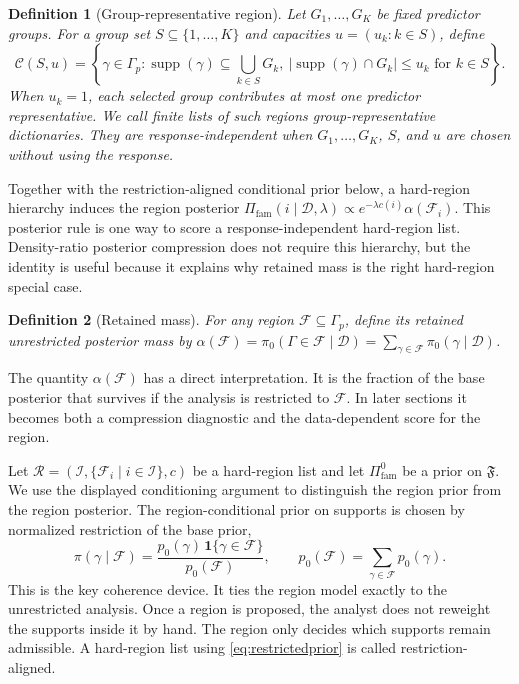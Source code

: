 \documentclass[twoside,11pt]{article}
\newtheorem{definition}{Definition}
\newcommand{\D}{\mathcal{D}}
\newcommand{\F}{\mathcal{F}}
\newcommand{\Fp}{\mathfrak{F}}
\newcommand{\ind}{\mathbf{1}}
\newcommand{\supp}{\operatorname{supp}}
\begin{document}
\begin{definition}[Group-representative region]
\label{def:grouprepresentative}
Let \(G_1,\dots,G_K\) be fixed predictor groups. For a group set \(S\subseteq\{1,\dots,K\}\) and capacities \(u=(u_k:k\in S)\), define
\[
\mathcal C(S,u) = \left\{\gamma\in\Gamma_p:\supp(\gamma)\subseteq\bigcup_{k\in S}G_k,\ |\supp(\gamma)\cap G_k|\le u_k \text{ for } k\in S\right\}.
\]
When \(u_k=1\), each selected group contributes at most one predictor representative. We call finite lists of such regions group-representative dictionaries. They are response-independent when \(G_1,\dots,G_K\), \(S\), and \(u\) are chosen without using the response.
\end{definition}

Together with the restriction-aligned conditional prior below, a hard-region hierarchy induces the region posterior \(\Pi_{\mathrm{fam}}(i \mid \D,\lambda)\propto e^{-\lambda c(i)}\alpha(\F_i)\). This posterior rule is one way to score a response-independent hard-region list. Density-ratio posterior compression does not require this hierarchy, but the identity is useful because it explains why retained mass is the right hard-region special case.

\begin{definition}[Retained mass] For any region \(\F \subseteq \Gamma_p\), define its retained unrestricted posterior mass by \(\alpha(\F) = \pi_0(\Gamma \in \F \mid \D)=\sum_{\gamma \in \F} \pi_0(\gamma \mid \D)\).
\end{definition}

The quantity $\alpha(\F)$ has a direct interpretation. It is the fraction of the base posterior that survives if the analysis is restricted to $\F$. In later sections it becomes both a compression diagnostic and the data-dependent score for the region.

Let \(\mathcal R=(\mathcal I,\{\F_i \mid i\in\mathcal I\},c)\) be a hard-region list and let \(\Pi_{\mathrm{fam}}^0\) be a prior on \(\Fp\). We use the displayed conditioning argument to distinguish the region prior from the region posterior. The region-conditional prior on supports is chosen by normalized restriction of the base prior,
\begin{equation}
\pi(\gamma \mid \F) = \frac{p_0(\gamma)\,\ind\{\gamma \in \F\}}{p_0(\F)}, \qquad p_0(\F) = \sum_{\gamma \in \F} p_0(\gamma). \label{eq:restrictedprior}
\end{equation}
This is the key coherence device. It ties the region model exactly to the unrestricted analysis. Once a region is proposed, the analyst does not reweight the supports inside it by hand. The region only decides which supports remain admissible. A hard-region list using \eqref{eq:restrictedprior} is called restriction-aligned.
\end{document}
